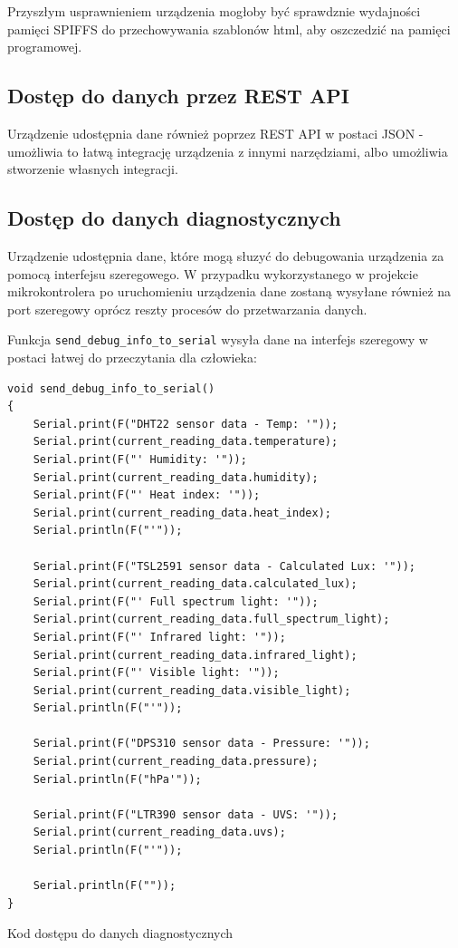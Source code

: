 \documentclass[12pt,a4paper]{article}
\begin{document}
Przyszłym usprawnieniem urządzenia mogłoby być sprawdznie wydajności pamięci SPIFFS do przechowywania szablonów html, aby oszczedzić na pamięci programowej. 

\subsection{Dostęp do danych przez REST API}

Urządzenie udostępnia dane również poprzez REST API w postaci JSON - umożliwia to łatwą integrację urządzenia z innymi narzędziami, 
albo umożliwia stworzenie własnych integracji. 

\subsection{Dostęp do danych diagnostycznych}

Urządzenie udostępnia dane, które mogą słuzyć do debugowania urządzenia za pomocą interfejsu szeregowego. W przypadku wykorzystanego w projekcie
mikrokontrolera po uruchomieniu urządzenia dane zostaną wysyłane również na port szeregowy oprócz reszty procesów do przetwarzania danych.

Funkcja \texttt{send\_debug\_info\_to\_serial} wysyła dane na interfejs szeregowy w postaci łatwej do przeczytania dla człowieka:

\begin{code}[H]
\begin{verbatim}
void send_debug_info_to_serial()
{
    Serial.print(F("DHT22 sensor data - Temp: '"));
    Serial.print(current_reading_data.temperature);
    Serial.print(F("' Humidity: '"));
    Serial.print(current_reading_data.humidity);
    Serial.print(F("' Heat index: '"));
    Serial.print(current_reading_data.heat_index);
    Serial.println(F("'"));

    Serial.print(F("TSL2591 sensor data - Calculated Lux: '"));
    Serial.print(current_reading_data.calculated_lux);
    Serial.print(F("' Full spectrum light: '"));
    Serial.print(current_reading_data.full_spectrum_light);
    Serial.print(F("' Infrared light: '"));
    Serial.print(current_reading_data.infrared_light);
    Serial.print(F("' Visible light: '"));
    Serial.print(current_reading_data.visible_light);
    Serial.println(F("'"));

    Serial.print(F("DPS310 sensor data - Pressure: '"));
    Serial.print(current_reading_data.pressure);
    Serial.println(F("hPa'"));

    Serial.print(F("LTR390 sensor data - UVS: '"));
    Serial.print(current_reading_data.uvs);
    Serial.println(F("'"));

    Serial.println(F(""));
}
\end{verbatim}
\caption{Kod dostępu do danych diagnostycznych}
\label{diagnostic-data-code}
\end{code}
\end{document}
